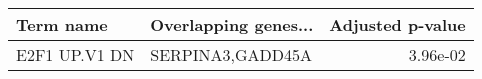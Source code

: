 \begin{tabular}{llr}
\toprule
    Term name & Overlapping genes... &  Adjusted p-value \\
\midrule
E2F1 UP.V1 DN &     SERPINA3,GADD45A &          3.96e-02 \\
\bottomrule
\end{tabular}
